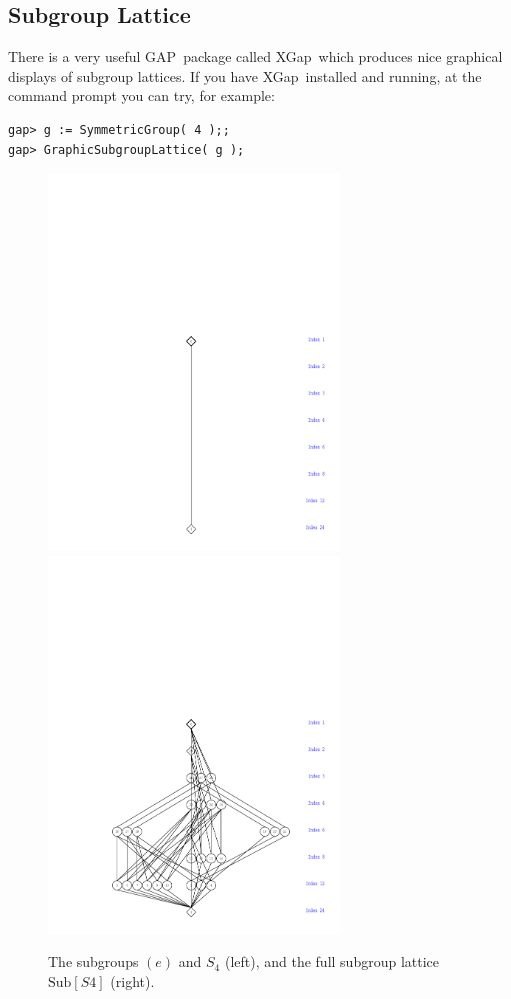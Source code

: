 \documentclass[11pt]{amsart}
\newcommand{\gap}{GAP}   %
\newcommand{\xgap}{XGap}   %
\theoremstyle{plain}
\newcommand{\codesize}{\footnotesize}
\newcommand{\<}{\ensuremath{\langle}}
\renewcommand{\>}{\ensuremath{\rangle}}
\newcommand{\Sub}{\ensuremath{\mathrm{Sub}}}
\begin{document}
\subsection{Subgroup Lattice}
There is a very useful \gap\ package called \xgap\ which produces nice graphical
displays of subgroup lattices.  If you have \xgap\ installed
and running, at the command prompt you can try, for example:
{\codesize
\begin{verbatim}
gap> g := SymmetricGroup( 4 );;
gap> GraphicSubgroupLattice( g );
\end{verbatim}
}  
\begin{figure}[!hb]
    \vspace{-4cm}
    \includegraphics[height=10cm]{trivialS4.pdf}%
    \includegraphics[height=10cm]{messyS4.pdf}%
    \caption{The subgroups $(e)$ and $S_4$ (left),
      and the full subgroup lattice $\Sub[S4]$ (right).}
    \label{fig:S4s}
\end{figure}
\end{document}
